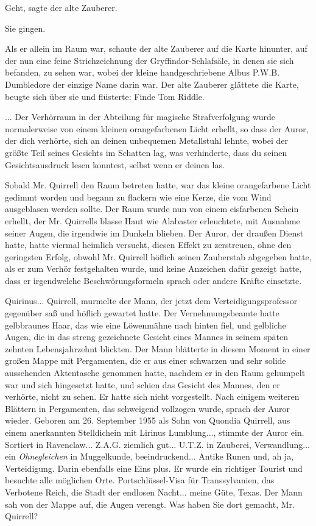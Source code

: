 \glqq{}Geht\grqq{}, sagte der alte Zauberer.

Sie gingen.

Als er allein im Raum war, schaute der alte Zauberer auf die Karte hinunter, auf
der nun eine feine Strichzeichnung der Gryffindor-Schlafsäle, in denen sie sich
befanden, zu sehen war, wobei der kleine handgeschriebene Albus P.W.B.
Dumbledore der einzige Name darin war. Der alte Zauberer glättete die Karte,
beugte sich über sie und flüsterte: \glqq{}Finde Tom Riddle.\grqq{}

... Der Verhörraum in der Abteilung für magische Strafverfolgung wurde
normalerweise von einem kleinen orangefarbenen Licht erhellt, so dass der Auror,
der dich verhörte, sich an deinen unbequemen Metallstuhl lehnte, wobei der
größte Teil seines Gesichts im Schatten lag, was verhinderte, dass du seinen
Gesichtsausdruck lesen konntest, selbst wenn er deinen las.

Sobald Mr. Quirrell den Raum betreten hatte, war das kleine orangefarbene Licht
gedimmt worden und begann zu flackern wie eine Kerze, die vom Wind ausgeblasen
werden sollte. Der Raum wurde nun von einem eisfarbenen Schein erhellt, der Mr.
Quirrells blasse Haut wie Alabaster erleuchtete, mit Ausnahme seiner Augen, die
irgendwie im Dunkeln blieben. Der Auror, der draußen Dienst hatte, hatte viermal
heimlich versucht, diesen Effekt zu zerstreuen, ohne den geringsten Erfolg,
obwohl Mr. Quirrell höflich seinen Zauberstab abgegeben hatte, als er zum Verhör
festgehalten wurde, und keine Anzeichen dafür gezeigt hatte, dass er
irgendwelche Beschwörungsformeln sprach oder andere Kräfte einsetzte.

\glqq{}Quirinus... Quirrell\grqq{}, murmelte der Mann, der jetzt dem
Verteidigungsprofessor gegenüber saß und höflich gewartet hatte. Der
Vernehmungsbeamte hatte gelbbraunes Haar, das wie eine Löwenmähne nach hinten
fiel, und gelbliche Augen, die in das streng gezeichnete Gesicht eines Mannes in
seinem späten zehnten Lebensjahrzehnt blickten. Der Mann blätterte in diesem
Moment in einer großen Mappe mit Pergamenten, die er aus einer schwarzen und
sehr solide aussehenden Aktentasche genommen hatte, nachdem er in den Raum
gehumpelt war und sich hingesetzt hatte, und schien das Gesicht des Mannes, den
er verhörte, nicht zu sehen. Er hatte sich nicht vorgestellt. Nach einigem
weiteren Blättern in Pergamenten, das schweigend vollzogen wurde, sprach der
Auror wieder. \glqq{}Geboren am 26. September 1955 als Sohn von Quondia Quirrell,
aus einem anerkannten Stelldichein mit Lirinus Lumblung...\grqq{}, stimmte der
Auror ein. \glqq{}Sortiert in Ravenclaw... Z.A.G. ziemlich gut... U.T.Z. in
Zauberei, Verwandlung... ein \emph{Ohnegleichen} in Muggelkunde,
beeindruckend... Antike Runen und, ah ja, Verteidigung. Darin ebenfalls eine
Eins plus. Er wurde ein richtiger Tourist und besuchte alle möglichen Orte.
Portschlüssel-Visa für Transsylvanien, das Verbotene Reich, die Stadt der
endlosen Nacht... meine Güte, Texas.\grqq{} Der Mann sah von der Mappe auf, die
Augen verengt. \glqq{}Was haben Sie dort gemacht, Mr. Quirrell?\grqq{}

